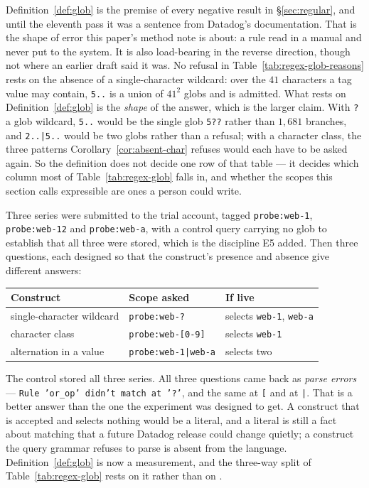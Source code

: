 \begin{remark}\label{rem:glob-constructs}
Definition~\ref{def:glob} is the premise of every negative result in
\S\ref{sec:regular}, and until the eleventh pass it was a sentence from Datadog's
documentation. That is the shape of error this paper's method note is about: a rule read
in a manual and never put to the system. It is also load-bearing in the reverse
direction, though not where an earlier draft said it was. No refusal in
Table~\ref{tab:regex-glob-reasons} rests on the absence of a single-character wildcard:
over the $41$ characters a tag value may contain, \texttt{5..} is a union of $41^{2}$
globs and is admitted. What rests on Definition~\ref{def:glob} is the \emph{shape} of
the answer, which is the larger claim. With \texttt{?} a glob wildcard, \texttt{5..}
would be the single glob \texttt{5??} rather than $1{,}681$ branches, and
\texttt{2..|5..} would be two globs rather than a refusal; with a character class, the
three patterns Corollary~\ref{cor:absent-char} refuses would each have to be asked
again. So the definition does not decide one row of that table --- it decides which
column most of Table~\ref{tab:regex-glob} falls in, and whether the scopes this section
calls expressible are ones a person could write.

Three series were submitted to the trial account, tagged \texttt{probe:web-1},
\texttt{probe:web-12} and \texttt{probe:web-a}, with a control query carrying no glob to
establish that all three were stored, which is the discipline E5 added. Then three
questions, each designed so that the construct's presence and absence give different
answers:

\begin{center}\footnotesize
\begin{tabular}{@{}lll@{}}
\toprule
Construct & Scope asked & If live \\
\midrule
single-character wildcard & \texttt{probe:web-?} & selects \texttt{web-1}, \texttt{web-a} \\
character class & \texttt{probe:web-[0-9]} & selects \texttt{web-1} \\
alternation in a value & \texttt{probe:web-1|web-a} & selects two \\
\bottomrule
\end{tabular}
\end{center}

\noindent
The control stored all three series. All three questions came back as \emph{parse
errors} --- \texttt{Rule 'or\_op' didn't match at '?'}, and the same at \texttt{[} and
at \texttt{|}. That is a better answer than the one the experiment was designed to get.
A construct that is accepted and selects nothing would be a literal, and a literal is
still a fact about matching that a future Datadog release could change quietly; a
construct the query grammar refuses to parse is absent from the language. Definition~\ref{def:glob}
is now a measurement, and the three-way split of Table~\ref{tab:regex-glob} rests on it
rather than on \citet{ddfilter}.


\end{remark}
